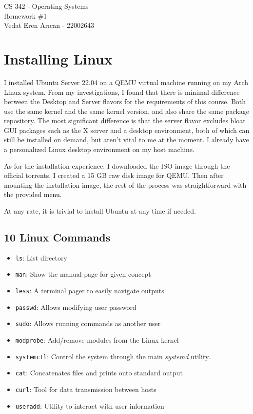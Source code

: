 \documentclass[a4paper, 12pt, titlepage]{article}
\begin{document}
  \begin{center}
    {\Large CS 342 - Operating Systems}\\
    {\vspace{1.5em}\large Homework \#1}\\
    {Vedat Eren Arıcan - 22002643}
  \end{center}
  
  \section{Installing Linux}

  I installed Ubuntu Server 22.04 on a QEMU virtual machine running on my Arch Linux system.
  From my investigations, I found that there is minimal difference between the Desktop and Server flavors
  for the requirements of this course. Both use the same kernel and the same kernel version,
  and also share the same package repository. The most significant difference is that the server flavor
  excludes bloat GUI packages such as the X server and a desktop environment, both of which can still
  be installed on demand, but aren't vital to me at the moment.
  I already have a personalized Linux desktop environment on my host machine.

  As for the installation experience: I downloaded the ISO image through the official torrents.
  I created a 15 GB raw disk image for QEMU. Then after mounting the installation image,
  the rest of the process was straightforward with the provided menu.

  At any rate, it is trivial to install Ubuntu at any time if needed.

  \subsection{10 Linux Commands}

  \begin{itemize}
    \item \texttt{ls}: List directory
    \item \texttt{man}: Show the manual page for given concept
    \item \texttt{less}: A terminal pager to easily navigate outputs
    \item \texttt{passwd}: Allows modifying user password
    \item \texttt{sudo}: Allows running commands as another user
    \item \texttt{modprobe}: Add/remove modules from the Linux kernel
    \item \texttt{systemctl}: Control the system through the main \textit{systemd} utility.
    \item \texttt{cat}: Concatenates files and prints onto standard output
    \item \texttt{curl}: Tool for data transmission between hosts
    \item \texttt{useradd}: Utility to interact with user information
  \end{itemize}
\end{document}
